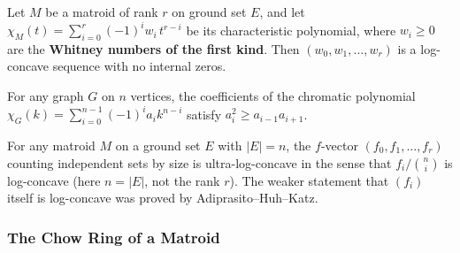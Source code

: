 \begin{theorem}\label{thm:ahk}
Let $M$ be a matroid of rank $r$ on ground set $E$, and let
$\chi_M(t) = \sum_{i = 0}^{r} (-1)^i w_i \, t^{r - i}$ be its
characteristic polynomial, where $w_i \ge 0$ are the
\textbf{Whitney numbers of the first kind}. Then $(w_0, w_1, \ldots, w_r)$
is a log-concave sequence with no internal zeros.
\end{theorem}

\begin{corollary}
For any graph $G$ on $n$ vertices, the coefficients of the chromatic
polynomial $\chi_G(k) = \sum_{i = 0}^{n - 1} (-1)^i a_i k^{n - i}$
satisfy $a_i^2 \ge a_{i - 1} a_{i + 1}$.
\end{corollary}

\begin{theorem}
For any matroid $M$ on a ground set $E$ with $|E| = n$, the $f$-vector
$(f_0, f_1, \ldots, f_r)$ counting independent sets by size is
ultra-log-concave in the sense that $f_i / \binom{n}{i}$ is
log-concave (here $n = |E|$, not the rank $r$). The weaker statement
that $(f_i)$ itself is log-concave was proved by
Adiprasito--Huh--Katz.
\end{theorem}

\subsubsection{The Chow Ring of a Matroid}

